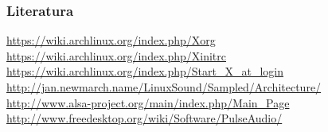 \documentclass[t,table,usenames,dvipsnames]{beamer}
\begin{document}
\begin{frame}
	\frametitle{Literatura}
	\url{https://wiki.archlinux.org/index.php/Xorg}\\
	\url{https://wiki.archlinux.org/index.php/Xinitrc}\\
	\url{https://wiki.archlinux.org/index.php/Start_X_at_login}
	\vfill
	\url{http://jan.newmarch.name/LinuxSound/Sampled/Architecture/}\\
	\url{http://www.alsa-project.org/main/index.php/Main_Page}\\
	\url{http://www.freedesktop.org/wiki/Software/PulseAudio/}
	\vfill
\end{frame}
\end{document}
